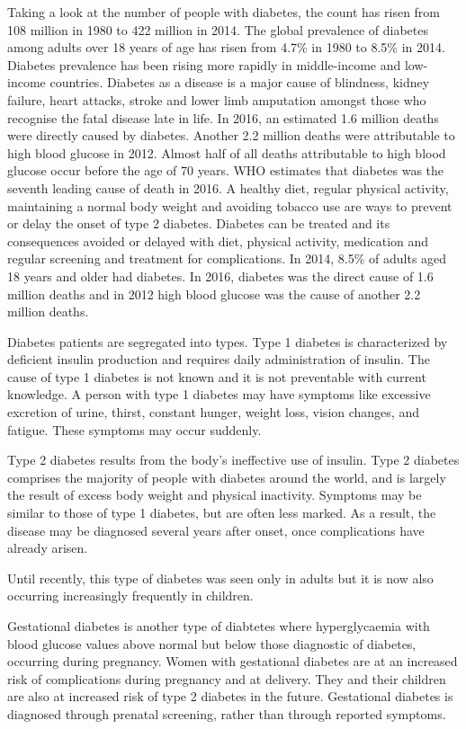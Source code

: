 \documentclass[12pt]{article}
\begin{document}
Taking a look at the number of people with diabetes, the count has risen from 108 million in 1980 to 422 million in 2014.
The global prevalence of diabetes among adults over 18 years of age has risen from 4.7\% in 1980 to 8.5\% in 2014. Diabetes prevalence has been rising more rapidly in middle-income and low-income countries.
Diabetes as a disease is a major cause of blindness, kidney failure, heart attacks, stroke and lower limb amputation amongst those who recognise the fatal disease late in life.
In 2016, an estimated 1.6 million deaths were directly caused by diabetes. Another 2.2 million deaths were attributable to high blood glucose in 2012. Almost half of all deaths attributable to high blood glucose occur before the age of 70 years. WHO estimates that diabetes was the seventh leading cause of death in 2016. A healthy diet, regular physical activity, maintaining a normal body weight and avoiding tobacco use are ways to prevent or delay the onset of type 2 diabetes. Diabetes can be treated and its consequences avoided or delayed with diet, physical activity, medication and regular screening and treatment for complications. In 2014, 8.5\% of adults aged 18 years and older had diabetes. In 2016, diabetes was the direct cause of 1.6 million deaths and in 2012 high blood glucose was the cause of another 2.2 million deaths.

Diabetes patients are segregated into types. Type 1 diabetes is characterized by deficient insulin production and requires daily administration of insulin. The cause of type 1 diabetes is not known and it is not preventable with current knowledge. A person with type 1 diabetes may have symptoms like excessive excretion of urine, thirst, constant hunger, weight loss, vision changes, and fatigue. These symptoms may occur suddenly.

Type 2 diabetes results from the body’s ineffective use of insulin. Type 2 diabetes comprises the majority of people with diabetes around the world, and is largely the result of excess body weight and physical inactivity. Symptoms may be similar to those of type 1 diabetes, but are often less marked. As a result, the disease may be diagnosed several years after onset, once complications have already arisen.

Until recently, this type of diabetes was seen only in adults but it is now also occurring increasingly frequently in children.

Gestational diabetes is another type of diabtetes where hyperglycaemia with blood glucose values above normal but below those diagnostic of diabetes, occurring during pregnancy. Women with gestational diabetes are at an increased risk of complications during pregnancy and at delivery. They and their children are also at increased risk of type 2 diabetes in the future. Gestational diabetes is diagnosed through prenatal screening, rather than through reported symptoms.
\end{document}
